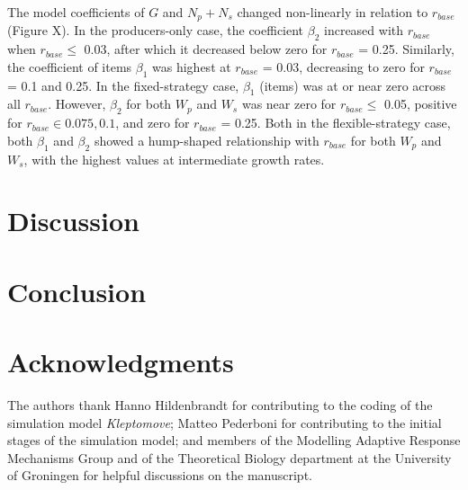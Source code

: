\documentclass[11pt]{article}
\begin{document}
The model coefficients of $G$ and $N_p + N_s$ changed non-linearly in relation to $r_{base}$ (Figure X).
In the producers-only case, the coefficient $\beta_2$ increased with $r_{base}$ when $r_{base} \leq$ 0.03, after which it decreased below zero for $r_{base}$ = 0.25.
Similarly, the coefficient of items $\beta_1$ was highest at $r_{base}$ = 0.03, decreasing to zero for $r_{base}$ = 0.1 and 0.25.
In the fixed-strategy case, $\beta_1$ (items) was at or near zero across all $r_{base}$.
However, $\beta_2$ for both $W_p$ and $W_s$ was near zero for $r_{base} \leq$ 0.05, positive for $r_{base} \in 0.075, 0.1$, and zero for $r_{base}$ = 0.25.
Both in the flexible-strategy case, both $\beta_1$ and $\beta_2$ showed a hump-shaped relationship with $r_{base}$ for both $W_p$ and $W_s$, with the highest values at intermediate growth rates.


\section*{Discussion}

\section*{Conclusion}



\section*{Acknowledgments}

The authors thank Hanno Hildenbrandt for contributing to the coding of the simulation model \textit{Kleptomove}; 
Matteo Pederboni for contributing to the initial stages of the simulation model; 
and members of the Modelling Adaptive Response Mechanisms Group and of the Theoretical Biology department at the University of Groningen for helpful discussions on the manuscript.
\end{document}
